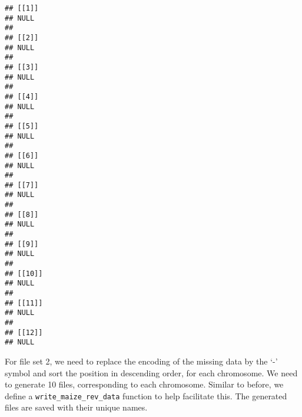 \documentclass[
]{article}
\newenvironment{Shaded}{\begin{snugshade}}{\end{snugshade}}
\newcommand{\AttributeTok}[1]{\textcolor[rgb]{0.13,0.29,0.53}{#1}}
\newcommand{\CommentTok}[1]{\textcolor[rgb]{0.56,0.35,0.01}{\textit{#1}}}
\newcommand{\ConstantTok}[1]{\textcolor[rgb]{0.56,0.35,0.01}{#1}}
\newcommand{\ControlFlowTok}[1]{\textcolor[rgb]{0.13,0.29,0.53}{\textbf{#1}}}
\newcommand{\FunctionTok}[1]{\textcolor[rgb]{0.13,0.29,0.53}{\textbf{#1}}}
\newcommand{\NormalTok}[1]{#1}
\newcommand{\OtherTok}[1]{\textcolor[rgb]{0.56,0.35,0.01}{#1}}
\newcommand{\SpecialCharTok}[1]{\textcolor[rgb]{0.81,0.36,0.00}{\textbf{#1}}}
\newcommand{\StringTok}[1]{\textcolor[rgb]{0.31,0.60,0.02}{#1}}
\begin{document}
\begin{Shaded}
\end{Shaded}

\begin{verbatim}
## [[1]]
## NULL
## 
## [[2]]
## NULL
## 
## [[3]]
## NULL
## 
## [[4]]
## NULL
## 
## [[5]]
## NULL
## 
## [[6]]
## NULL
## 
## [[7]]
## NULL
## 
## [[8]]
## NULL
## 
## [[9]]
## NULL
## 
## [[10]]
## NULL
## 
## [[11]]
## NULL
## 
## [[12]]
## NULL
\end{verbatim}

For file set 2, we need to replace the encoding of the missing data by
the `-' symbol and sort the position in descending order, for each
chromosome. We need to generate 10 files, corresponding to each
chromosome. Similar to before, we define a
\texttt{write\_maize\_rev\_data} function to help facilitate this. The
generated files are saved with their unique names.
\end{document}
